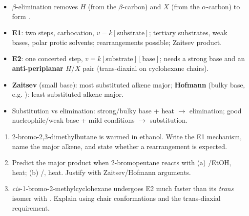 \documentclass[11pt]{article}
\begin{document}
\begin{aretenir}
\begin{itemize}
\item $\beta$-elimination removes $H$ (from the $\beta$-carbon) and $X$ (from the $\alpha$-carbon) to form .
\item \textbf{E1}: two steps, carbocation, $v=k[\text{substrate}]$; tertiary substrates, weak bases, polar protic solvents; rearrangements possible; Zaitsev product.
\item \textbf{E2}: one concerted step, $v=k[\text{substrate}][\text{base}]$; needs a strong base and an \textbf{anti-periplanar} $H$/$X$ pair (trans-diaxial on cyclohexane chairs).
\item \textbf{Zaitsev} (small base): most substituted alkene major; \textbf{Hofmann} (bulky base, e.g. ): least substituted alkene major.
\item Substitution vs elimination: strong/bulky base + heat $\rightarrow$ elimination; good nucleophile/weak base + mild conditions $\rightarrow$ substitution.
\end{itemize}
\end{aretenir}

\begin{exercice}
\begin{enumerate}
\item 2-bromo-2,3-dimethylbutane is warmed in ethanol. Write the E1 mechanism, name the major alkene, and state whether a rearrangement is expected.
\item Predict the major product when 2-bromopentane reacts with (a) /EtOH, heat; (b) /, heat. Justify with Zaitsev/Hofmann arguments.
\item \emph{cis}-1-bromo-2-methylcyclohexane undergoes E2 much faster than its \emph{trans} isomer with . Explain using chair conformations and the trans-diaxial requirement.
\end{enumerate}
\end{exercice}
\end{document}
